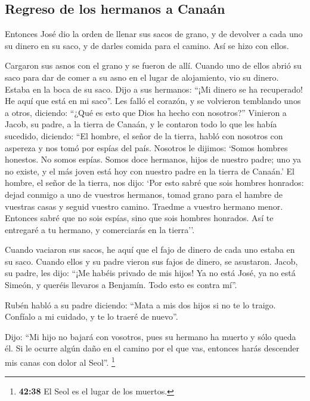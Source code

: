\begin{paracol}{2}
\hypertarget{regreso-de-los-hermanos-a-canauxe1n}{%
\subsection{Regreso de los hermanos a
Canaán}\label{regreso-de-los-hermanos-a-canauxe1n}}

 Entonces José dio la orden de llenar sus sacos de grano,
y de devolver a cada uno su dinero en su saco, y de darles comida para
el camino. Así se hizo con ellos.

 Cargaron sus asnos con el grano y se fueron de allí.
 Cuando uno de ellos abrió su saco para dar de comer a su
asno en el lugar de alojamiento, vio su dinero. Estaba en la boca de su
saco.  Dijo a sus hermanos: ``¡Mi dinero se ha
recuperado! He aquí que está en mi saco''. Les falló el corazón, y se
volvieron temblando unos a otros, diciendo: ``¿Qué es esto que Dios ha
hecho con nosotros?''  Vinieron a Jacob, su padre, a la
tierra de Canaán, y le contaron todo lo que les había sucedido,
diciendo:  ``El hombre, el señor de la tierra, habló con
nosotros con aspereza y nos tomó por espías del país. 
Nosotros le dijimos: `Somos hombres honestos. No somos espías.
 Somos doce hermanos, hijos de nuestro padre; uno ya no
existe, y el más joven está hoy con nuestro padre en la tierra de
Canaán.'  El hombre, el señor de la tierra, nos dijo:
`Por esto sabré que sois hombres honrados: dejad conmigo a uno de
vuestros hermanos, tomad grano para el hambre de vuestras casas y seguid
vuestro camino.  Traedme a vuestro hermano menor.
Entonces sabré que no sois espías, sino que sois hombres honrados. Así
te entregaré a tu hermano, y comerciarás en la tierra''.

 Cuando vaciaron sus sacos, he aquí que el fajo de dinero
de cada uno estaba en su saco. Cuando ellos y su padre vieron sus fajos
de dinero, se asustaron.  Jacob, su padre, les dijo:
``¡Me habéis privado de mis hijos! Ya no está José, ya no está Simeón, y
queréis llevaros a Benjamín. Todo esto es contra mí''.

 Rubén habló a su padre diciendo: ``Mata a mis dos hijos
si no te lo traigo. Confíalo a mi cuidado, y te lo traeré de nuevo''.

 Dijo: ``Mi hijo no bajará con vosotros, pues su hermano
ha muerto y sólo queda él. Si le ocurre algún daño en el camino por el
que vas, entonces harás descender mis canas con dolor al Seol''.
\footnote{\textbf{42:38} El Seol es el lugar de los muertos.}


\end{paracol}
